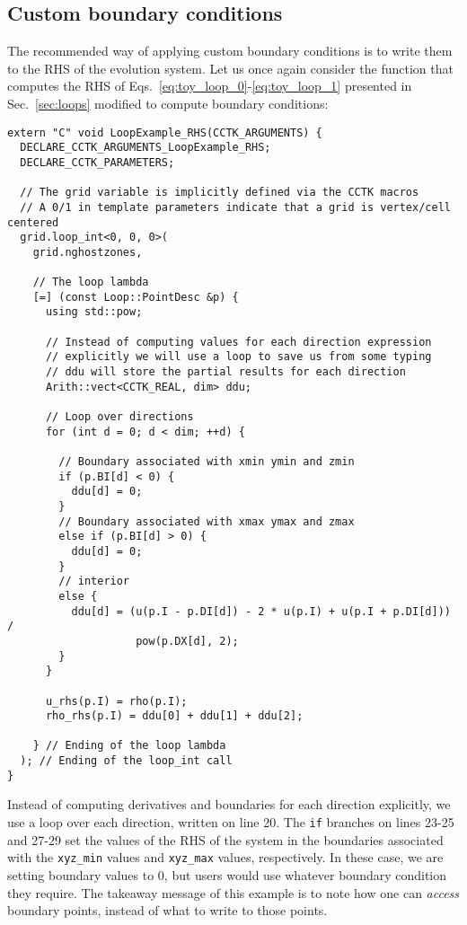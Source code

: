 \subsection{Custom boundary conditions}

The recommended way of applying custom boundary conditions is to write them to the RHS of the evolution system. Let us once again consider the function that computes the RHS of Eqs.~\eqref{eq:toy_loop_0}-\eqref{eq:toy_loop_1} presented in Sec.~\ref{sec:loops} modified to compute boundary conditions:

\begin{lstlisting}
extern "C" void LoopExample_RHS(CCTK_ARGUMENTS) {
  DECLARE_CCTK_ARGUMENTS_LoopExample_RHS;
  DECLARE_CCTK_PARAMETERS;

  // The grid variable is implicitly defined via the CCTK macros
  // A 0/1 in template parameters indicate that a grid is vertex/cell centered
  grid.loop_int<0, 0, 0>(
    grid.nghostzones,

    // The loop lambda
    [=] (const Loop::PointDesc &p) {
      using std::pow;

      // Instead of computing values for each direction expression
      // explicitly we will use a loop to save us from some typing
      // ddu will store the partial results for each direction
      Arith::vect<CCTK_REAL, dim> ddu;
      
      // Loop over directions
      for (int d = 0; d < dim; ++d) {
        
        // Boundary associated with xmin ymin and zmin
        if (p.BI[d] < 0) {
          ddu[d] = 0;
        }
        // Boundary associated with xmax ymax and zmax
        else if (p.BI[d] > 0) {
          ddu[d] = 0;
        }
        // interior
        else {
          ddu[d] = (u(p.I - p.DI[d]) - 2 * u(p.I) + u(p.I + p.DI[d])) /
                    pow(p.DX[d], 2);
        }
      }

      u_rhs(p.I) = rho(p.I);
      rho_rhs(p.I) = ddu[0] + ddu[1] + ddu[2];

    } // Ending of the loop lambda
  ); // Ending of the loop_int call
}
\end{lstlisting}

Instead of computing derivatives and boundaries for each direction explicitly, we use a loop over each direction, written on line 20. The \texttt{if} branches on lines 23-25 and 27-29 set the values of the RHS of the system in the boundaries associated with the \texttt{xyz\_min} values and \texttt{xyz\_max} values, respectively. In these case, we are setting boundary values to $0$, but users would use whatever boundary condition they require. The takeaway message of this example is to note how one can \textit{access} boundary points, instead of what to write to those points.

